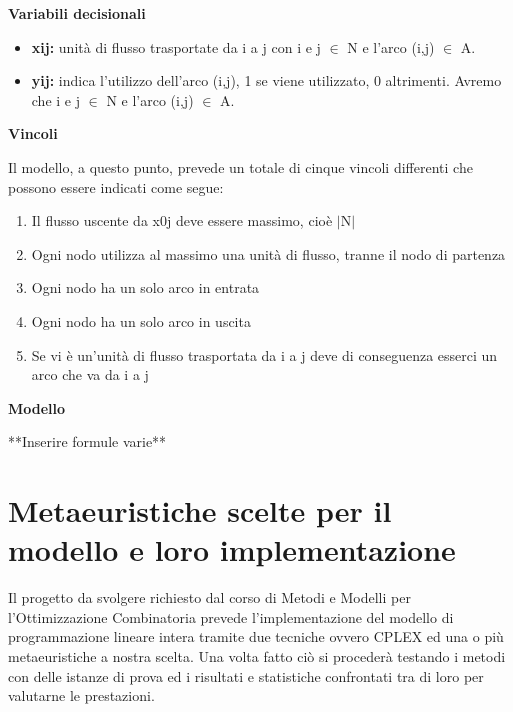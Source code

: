\documentclass[preprint,12pt]{elsarticle}
\begin{document}
\begin{large}
\textbf{Variabili decisionali}
\end{large}

\begin{itemize}
\item \textbf{x{\tiny ij}:} unità di flusso trasportate da i a j con i e j  $\in$ N e l'arco (i,j) $\in$ A.
\item \textbf{y{\tiny ij}:} indica l'utilizzo dell'arco (i,j), 1 se viene utilizzato, 0 altrimenti. Avremo che i e j  $\in$ N e l'arco (i,j) $\in$ A.\\

\end{itemize}

\begin{large}
\textbf{Vincoli\\}
\end{large}

Il modello, a questo punto, prevede un totale di cinque vincoli differenti che possono essere indicati come segue:


\begin{enumerate}
\item Il flusso uscente da x{\tiny 0j} deve essere massimo, cioè $\mid$N$\mid$
\item Ogni nodo utilizza al massimo una unità di flusso, tranne il nodo di partenza
\item Ogni nodo ha un solo arco in entrata
\item Ogni nodo ha un solo arco in uscita
\item Se vi è un'unità di flusso trasportata da i a j deve di conseguenza esserci un arco che va da i a j\\
\end{enumerate}

\begin{large}
\textbf{Modello\\}
\end{large}
**Inserire formule varie**

\section{Metaeuristiche scelte per il modello e loro implementazione}

Il progetto da svolgere richiesto dal corso di Metodi e Modelli per l'Ottimizzazione Combinatoria prevede l'implementazione del modello di programmazione lineare intera tramite due tecniche ovvero CPLEX ed una o più metaeuristiche a nostra scelta. Una volta fatto ciò si procederà testando i metodi con delle istanze di prova ed i risultati e statistiche confrontati tra di loro per valutarne le prestazioni.
\end{document}
